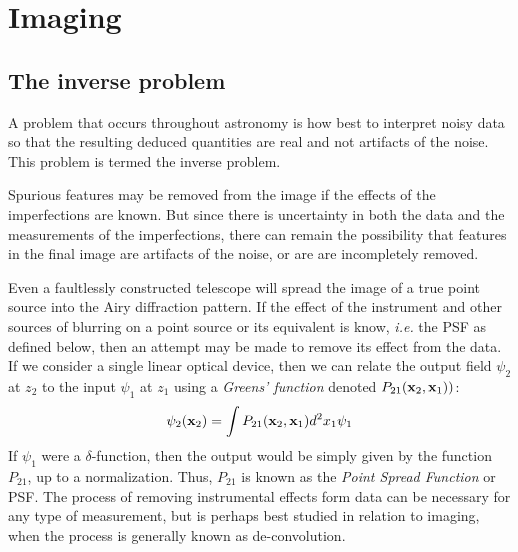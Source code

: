 %
\section{Imaging}

\subsection{The inverse problem}

A problem that occurs throughout astronomy is how best to interpret noisy data so that the resulting deduced quantities are real and not artifacts of the noise. This problem is termed the inverse problem. 

Spurious features may be removed from the image if the effects of the imperfections are known. But since there is uncertainty in both the data and the measurements of the imperfections, there can remain the possibility that features in the final image are artifacts of the noise, or are are incompletely removed.

Even a faultlessly constructed telescope will spread the image of a true point source into the Airy diffraction pattern. If the effect of the instrument and other sources of blurring on a point source or its equivalent is know, {\it i.e.} the PSF as defined below, then an attempt may be made to remove its effect from the data. If we consider a single linear optical device, then we can relate the output field $\psi_2$ at $z_2$ to the input $\psi_1$ at $z_1$ using a {\it Greens' function} denoted $P_{21}({\bf x}_2,{\bf x}_1))$: 
\[
\psi_2({\bf x}_2)=\int P_{21}({\bf x}_2,{\bf x}_1)d^2x_1\psi_1
\]
If $\psi_1$ were a $\delta$-function, then the output would be simply given by the function $P_{21}$, up to a normalization. Thus, $P_{21}$ is known as the {\it Point Spread Function} or PSF. The process of removing instrumental effects form data can be necessary for any type of measurement, but is perhaps best studied in relation to imaging, when the process is generally known as de-convolution.

